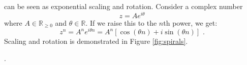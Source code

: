  can be seen as exponential scaling and rotation. Consider a complex number
\begin{equation}
  z = A e^{i\theta}
\end{equation}
where $A \in \mathbb{R}_{\ge 0}$ and $\theta \in \mathbb{R}$. If we raise this to the $n$th power, we get:
\begin{equation}
  z^n = A^n e^{i\theta n} = A^n [\cos(\theta n) + i \sin(\theta n)]\,\,.
\end{equation}
Scaling and rotation is demonstrated in Figure \ref{fig:spirals}.

.






